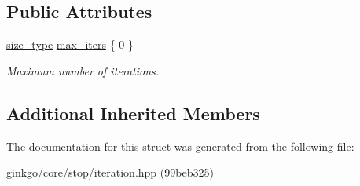 \subsection*{Public Attributes}
\begin{DoxyCompactItemize}
\item 
\mbox{\label{structgko_1_1stop_1_1Iteration_1_1parameters__type_a7daf7ecb5cf107b9e7444b0898f691c4}} 
\hyperlink{namespacegko_a6e5c95df0ae4e47aab2f604a22d98ee7}{size\+\_\+type} \hyperlink{structgko_1_1stop_1_1Iteration_1_1parameters__type_a7daf7ecb5cf107b9e7444b0898f691c4}{max\+\_\+iters} \{ 0 \}
\begin{DoxyCompactList}\small\item\em Maximum number of iterations. \end{DoxyCompactList}\end{DoxyCompactItemize}
\subsection*{Additional Inherited Members}


The documentation for this struct was generated from the following file\+:\begin{DoxyCompactItemize}
\item 
ginkgo/core/stop/iteration.\+hpp (99beb325)\end{DoxyCompactItemize}
